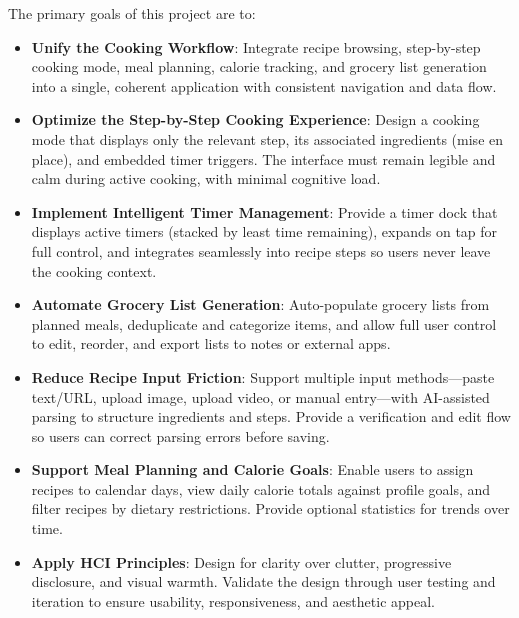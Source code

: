 The primary goals of this project are to:

\begin{itemize}
  \item \textbf{Unify the Cooking Workflow}: Integrate recipe browsing, step-by-step cooking mode, meal planning, calorie tracking, and grocery list generation into a single, coherent application with consistent navigation and data flow.
  \item \textbf{Optimize the Step-by-Step Cooking Experience}: Design a cooking mode that displays only the relevant step, its associated ingredients (mise en place), and embedded timer triggers. The interface must remain legible and calm during active cooking, with minimal cognitive load.
  \item \textbf{Implement Intelligent Timer Management}: Provide a timer dock that displays active timers (stacked by least time remaining), expands on tap for full control, and integrates seamlessly into recipe steps so users never leave the cooking context.
  \item \textbf{Automate Grocery List Generation}: Auto-populate grocery lists from planned meals, deduplicate and categorize items, and allow full user control to edit, reorder, and export lists to notes or external apps.
  \item \textbf{Reduce Recipe Input Friction}: Support multiple input methods---paste text/URL, upload image, upload video, or manual entry---with AI-assisted parsing to structure ingredients and steps. Provide a verification and edit flow so users can correct parsing errors before saving.
  \item \textbf{Support Meal Planning and Calorie Goals}: Enable users to assign recipes to calendar days, view daily calorie totals against profile goals, and filter recipes by dietary restrictions. Provide optional statistics for trends over time.
  \item \textbf{Apply HCI Principles}: Design for clarity over clutter, progressive disclosure, and visual warmth. Validate the design through user testing and iteration to ensure usability, responsiveness, and aesthetic appeal.
\end{itemize}
